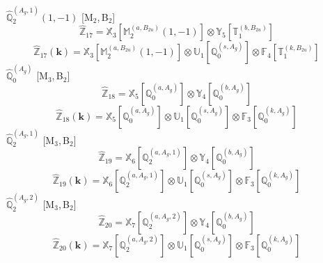 \documentclass[fleqn,10pt,landscape]{article}
\begin{document}
\begin{itemize}
\vspace{4mm}
\noindent {} $\,\,\,\hat{\mathbb{Q}}_{2}^{(A_{g},1)}(1,-1)$ [M$_{2}$,\,B$_{2}$]
\begin{dmath*}
\hat{\mathbb{Z}}_{17}=\mathbb{X}_{3}[\mathbb{M}_{2}^{(a,B_{2u})}(1,-1)] \otimes\mathbb{Y}_{5}[\mathbb{T}_{1}^{(b,B_{2u})}]
\end{dmath*}
\begin{dmath*}
\hat{\mathbb{Z}}_{17}(\bm{k})=\mathbb{X}_{3}[\mathbb{M}_{2}^{(a,B_{2u})}(1,-1)] \otimes\mathbb{U}_{1}[\mathbb{Q}_{0}^{(s,A_{g})}] \otimes\mathbb{F}_{4}[\mathbb{T}_{1}^{(k,B_{2u})}]
\end{dmath*}
\vspace{4mm}
\noindent {} $\,\,\,\hat{\mathbb{Q}}_{0}^{(A_{g})}$ [M$_{3}$,\,B$_{2}$]
\begin{dmath*}
\hat{\mathbb{Z}}_{18}=\mathbb{X}_{5}[\mathbb{Q}_{0}^{(a,A_{g})}] \otimes\mathbb{Y}_{4}[\mathbb{Q}_{0}^{(b,A_{g})}]
\end{dmath*}
\begin{dmath*}
\hat{\mathbb{Z}}_{18}(\bm{k})=\mathbb{X}_{5}[\mathbb{Q}_{0}^{(a,A_{g})}] \otimes\mathbb{U}_{1}[\mathbb{Q}_{0}^{(s,A_{g})}] \otimes\mathbb{F}_{3}[\mathbb{Q}_{0}^{(k,A_{g})}]
\end{dmath*}
\vspace{4mm}
\noindent {} $\,\,\,\hat{\mathbb{Q}}_{2}^{(A_{g},1)}$ [M$_{3}$,\,B$_{2}$]
\begin{dmath*}
\hat{\mathbb{Z}}_{19}=\mathbb{X}_{6}[\mathbb{Q}_{2}^{(a,A_{g},1)}] \otimes\mathbb{Y}_{4}[\mathbb{Q}_{0}^{(b,A_{g})}]
\end{dmath*}
\begin{dmath*}
\hat{\mathbb{Z}}_{19}(\bm{k})=\mathbb{X}_{6}[\mathbb{Q}_{2}^{(a,A_{g},1)}] \otimes\mathbb{U}_{1}[\mathbb{Q}_{0}^{(s,A_{g})}] \otimes\mathbb{F}_{3}[\mathbb{Q}_{0}^{(k,A_{g})}]
\end{dmath*}
\vspace{4mm}
\noindent {} $\,\,\,\hat{\mathbb{Q}}_{2}^{(A_{g},2)}$ [M$_{3}$,\,B$_{2}$]
\begin{dmath*}
\hat{\mathbb{Z}}_{20}=\mathbb{X}_{7}[\mathbb{Q}_{2}^{(a,A_{g},2)}] \otimes\mathbb{Y}_{4}[\mathbb{Q}_{0}^{(b,A_{g})}]
\end{dmath*}
\begin{dmath*}
\hat{\mathbb{Z}}_{20}(\bm{k})=\mathbb{X}_{7}[\mathbb{Q}_{2}^{(a,A_{g},2)}] \otimes\mathbb{U}_{1}[\mathbb{Q}_{0}^{(s,A_{g})}] \otimes\mathbb{F}_{3}[\mathbb{Q}_{0}^{(k,A_{g})}]
\end{dmath*}

\end{itemize}
\end{document}

